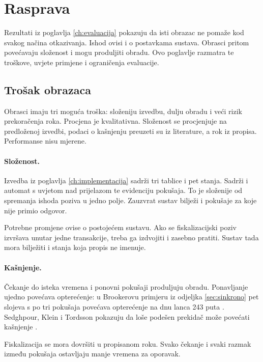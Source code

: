 \section{Rasprava}
\label{ch:rasprava}

Rezultati iz poglavlja \ref{ch:evaluacija} pokazuju da isti obrazac ne pomaže
kod svakog načina otkazivanja. Ishod ovisi i o postavkama sustava. Obrasci
pritom povećavaju složenost i mogu produljiti obradu. Ovo poglavlje razmatra
te troškove, uvjete primjene i ograničenja evaluacije.

\subsection{Trošak obrazaca}
\label{sec:cijena}

Obrasci imaju tri moguća troška: složeniju izvedbu, dulju obradu i veći rizik
prekoračenja roka. Procjena je kvalitativna. Složenost se procjenjuje na
predloženoj izvedbi, podaci o kašnjenju preuzeti su iz literature, a rok iz
propisa. Performanse nisu mjerene.

\paragraph{Složenost.}
Izvedba iz poglavlja \ref{ch:implementacija} sadrži tri tablice i pet stanja.
Sadrži i automat s uvjetom nad prijelazom te evidenciju pokušaja. To je
složenije od spremanja ishoda poziva u jedno polje. Zauzvrat sustav bilježi
i pokušaje za koje nije primio odgovor.

Potrebne promjene ovise o postojećem sustavu. Ako se fiskalizacijski poziv
izvršava unutar jedne transakcije, treba ga izdvojiti i zasebno pratiti.
Sustav tada mora bilježiti i stanja koja propis ne imenuje.

\paragraph{Kašnjenje.}
Čekanje do isteka vremena i ponovni pokušaji produljuju obradu. Ponavljanje
ujedno povećava opterećenje: u Brookerovu primjeru iz
odjeljka \ref{sec:sinkrono} pet slojeva s po tri pokušaja povećava opterećenje
na dnu lanca 243 puta \cite{brookertimeouts}. Sedghpour, Klein i Tordsson
pokazuju da loše podešen prekidač može povećati
kašnjenje \cite{sedghpour2022empirical}.

Fiskalizacija se mora dovršiti u propisanom roku. Svako čekanje i svaki
razmak između pokušaja ostavljaju manje vremena za oporavak.

